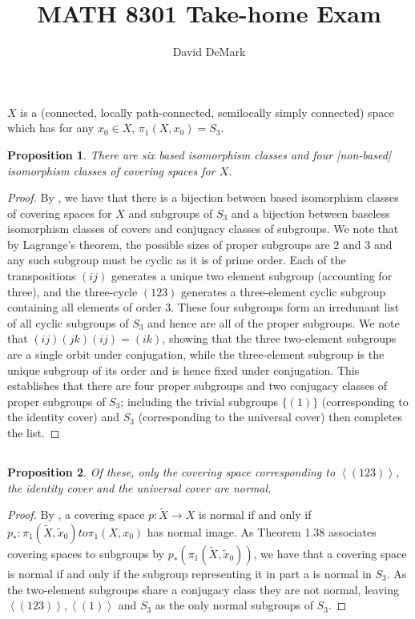 \documentclass[english]{article}
\title{MATH 8301 Take-home Exam}
\author{David DeMark}
\date{\due}
\newcommand{\prob}[1]{\setcounter{section}{#1-1}\section{}}
\newcommand{\prt}[1]{\setcounter{subsection}{#1-1}\subsection{}}
\newtheorem*{prop*}{Proposition}
\theoremstyle{remark}
\theoremstyle{definition}
\newcommand{\tX}{\tilde{X}}
\newcommand{\tx}{\tilde{x}}
\newcommand{\idl}[1]{\left\langle #1 \right \rangle}
\begin{document}
\maketitle
\prob{1}\prt{1} $X$ is a (connected, locally path-connected, semilocally simply connected) space which has for any $x_0\in X$, $\pi_1(X,x_0)=S_3$.
\begin{prop*}
	There are six based isomorphism classes and four [non-based] isomorphism classes of covering spaces for $X$. 
\end{prop*}
\begin{proof}
	By \cite[Theorem 1.38]{at}, we have that there is a bijection between based isomorphism classes of covering spaces for $X$ and subgroups of $S_3$ and a bijection between baseless isomorphism classes of covers and conjugacy classes of subgroups. We note that by Lagrange's theorem, the possible sizes of proper subgroups are $2$ and $3$ and any such subgroup must be cyclic as it is of prime order. Each of the transpositions $(ij)$ generates a unique two element subgroup (accounting for three), and the three-cycle $(123)$ generates a three-element cyclic subgroup containing all elements of order 3. These four subgroups form an irredunant list of all cyclic subgroups of $S_3$ and hence are all of the proper subgroups. We note that $(ij)(jk)(ij)=(ik)$, showing that the three two-element subgroups are a single orbit under conjugation, while the three-element subgroup is the unique subgroup of its order and is hence fixed under conjugation. This establishes that there are four proper subgroups and two conjugacy classes of proper subgroups of $S_3$; including the trivial subgroups $\{(1)\}$ (corresponding to the identity cover) and $S_3$ (corresponding to the universal cover) then completes the list. 
\end{proof}
\prt{2}
\begin{prop*}
	Of these, only the covering space corresponding to $\idl{(123)}$, the identity cover and the universal cover are normal. 
\end{prop*}
\begin{proof}
By \cite[Proposition 1.39]{at}, a covering space $p:\tX\to X$ is normal if and only if $p_*:\pi_1(\tX,\tx_0)to \pi_1(X,x_0)$ has normal image. As Theorem 1.38 associates covering spaces to subgroups by $p_*(\pi_1(\tX,\tx_0))$, we have that a covering space is normal if and only if the subgroup representing it in part a is normal in $S_3$. As the two-element subgroups share a conjugacy class they are not normal, leaving $\idl{(123)},\idl{(1)}$ and $S_3$ as the only normal subgroups of $S_3$. \end{proof}
\end{document}
